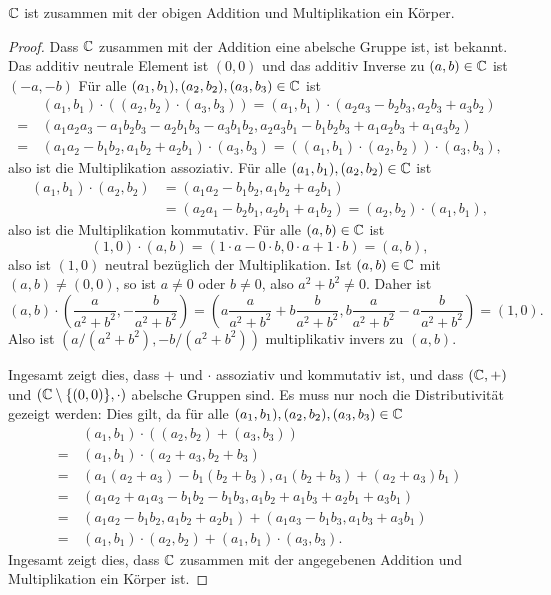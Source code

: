 \begin{beh}
 $\mathbb{C}$ ist zusammen mit der obigen Addition und Multiplikation ein Körper.
\end{beh}
\begin{proof}
 Dass $\mathbb{C}$ zusammen mit der Addition eine abelsche Gruppe ist, ist bekannt. Das additiv neutrale Element ist $(0,0)$ und das additiv Inverse zu $(a,b) \in \mathbb{C}$ ist $(-a,-b)$ Für alle $(a_1, b_1), (a_2, b_2), (a_3, b_3) \in \mathbb{C}$ ist
 \begin{align*}
   &\, (a_1, b_1) \cdot ((a_2, b_2) \cdot (a_3, b_3))
  = (a_1, b_1) \cdot (a_2 a_3 - b_2 b_3, a_2 b_3 + a_3 b_2) \\
  =&\, (a_1 a_2 a_3 - a_1 b_2 b_3 - a_2 b_1 b_3 - a_3 b_1 b_2, a_2 a_3 b_1 - b_1 b_2 b_3 + a_1 a_2 b_3 + a_1 a_3 b_2) \\
  =&\, (a_1 a_2 - b_1 b_2, a_1 b_2 + a_2 b_1) \cdot (a_3, b_3)
  = ((a_1, b_1) \cdot (a_2, b_2)) \cdot (a_3, b_3),
 \end{align*}
 also ist die Multiplikation assoziativ. Für alle $(a_1, b_1), (a_2, b_2) \in \mathbb{C}$ ist
 \begin{align*}
  (a_1, b_1) \cdot (a_2, b_2)
  &= (a_1 a_2 - b_1 b_2, a_1 b_2 + a_2 b_1) \\
  &= (a_2 a_1 - b_2 b_1, a_2 b_1 + a_1 b_2)
  = (a_2, b_2) \cdot (a_1, b_1),
 \end{align*}
 also ist die Multiplikation kommutativ. Für alle $(a,b) \in \mathbb{C}$ ist
 \[
  (1,0) \cdot (a,b) = (1 \cdot a - 0 \cdot b, 0 \cdot a + 1 \cdot b) = (a,b),
 \]
 also ist $(1,0)$ neutral bezüglich der Multiplikation. Ist $(a,b) \in \mathbb{C}$ mit $(a,b) \neq (0,0)$, so ist $a \neq 0$ oder $b \neq 0$, also $a^2+b^2 \neq 0$. Daher ist
 \[
  (a,b) \cdot \left(\frac{a}{a^2+b^2}, -\frac{b}{a^2+b^2}\right)
  = \left( a \frac{a}{a^2+b^2} + b \frac{b}{a^2+b^2}, b \frac{a}{a^2+b^2} - a \frac{b}{a^2+b^2} \right)
  = (1,0).
 \]
 Also ist $(a/(a^2+b^2), -b/(a^2+b^2))$ multiplikativ invers zu $(a,b)$.
 
 Ingesamt zeigt dies, dass $+$ und $\cdot$ assoziativ und kommutativ ist, und dass $(\mathbb{C},+)$ und $(\mathbb{C}\setminus\{(0,0)\}, \cdot)$ abelsche Gruppen sind. Es muss nur noch die Distributivität gezeigt werden: Dies gilt, da für alle $(a_1, b_1), (a_2, b_2), (a_3, b_3) \in \mathbb{C}$
 \begin{align*}
   &\, (a_1, b_1) \cdot ((a_2, b_2) + (a_3, b_3)) \\
  =&\,    (a_1, b_1) \cdot (a_2 + a_3, b_2 + b_3) \\
  =&\, (a_1 (a_2 + a_3) - b_1 (b_2 + b_3), a_1 (b_2 + b_3) + (a_2 + a_3) b_1) \\
  =&\, (a_1 a_2 + a_1 a_3 - b_1 b_2 - b_1 b_3, a_1 b_2 + a_1 b_3 + a_2 b_1 + a_3 b_1) \\
  =&\, (a_1 a_2 - b_1 b_2, a_1 b_2 + a_2 b_1) + (a_1 a_3 - b_1 b_3, a_1 b_3 + a_3 b_1) \\
  =&\, (a_1, b_1) \cdot (a_2, b_2) + (a_1, b_1) \cdot (a_3, b_3).
 \end{align*}
 Ingesamt zeigt dies, dass $\mathbb{C}$ zusammen mit der angegebenen Addition und Multiplikation ein Körper ist.
\end{proof}

